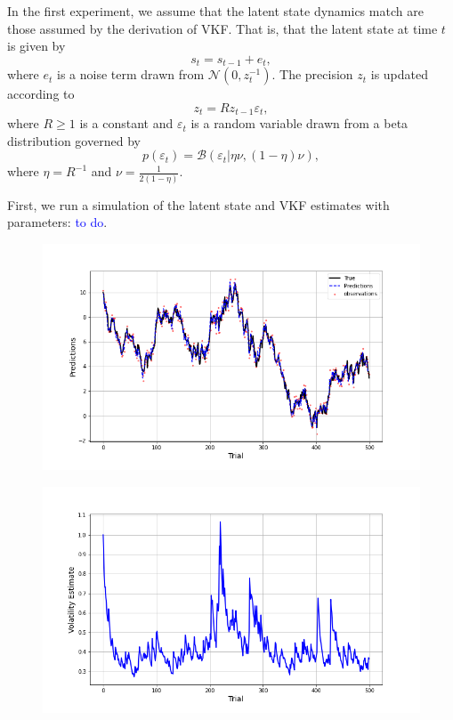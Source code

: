 \documentclass[12pt]{article}
\newcommand{\eps}{\varepsilon}
\theoremstyle{definition}
\begin{document}
In the first experiment, we assume that the latent state dynamics match are those assumed by the derivation of VKF. That is, that the latent state at time $t$ is given by 
$$s_t = s_{t-1}+e_t,$$
where $e_t$ is a noise term drawn from $\mathcal{N}(0,z_t^{-1}).$ 
The precision $z_t$ is updated according to 
$$z_t = Rz_{t-1}\eps_t,$$
where $R \geq 1$ is a constant and $\eps_t$ is a random variable drawn from a beta distribution governed by 
$$p(\eps_t) = \mathcal{B}(\eps_t \vert \eta\nu, (1-\eta)\nu),$$
where $\eta = R^{-1}$ and $\nu = \frac{1}{2(1-\eta)}$.

First, we run a simulation of the latent state and VKF estimates with parameters: \textcolor{blue}{to do}. 

\begin{figure}[H]
    \centering
    \includegraphics[scale=0.6]{../Figures/exp1_walk.png}
\end{figure}

\begin{figure}[H]
    \centering
    \includegraphics[scale=0.6]{../Figures/exp1_vol.png}
\end{figure}
\end{document}
